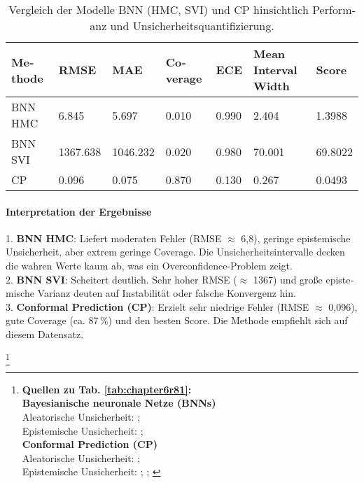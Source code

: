 \begin{otherlanguage}{ngerman}
\begin{table}[htbp]
\centering
\footnotesize
\begin{tabularx}{\textwidth}{|l|X|X|X|X|X|X|}
\hline
\textbf{Methode} & \textbf{RMSE} & \textbf{MAE} & \textbf{Coverage} & \textbf{ECE} & \textbf{Mean Interval Width} & \textbf{Score} \\
\hline
BNN HMC & 6.845 & 5.697 & 0.010 & 0.990 & 2.404 & 1.3988 \\
\hline
BNN SVI & 1367.638 & 1046.232 & 0.020 & 0.980 & 70.001 & 69.8022 \\
\hline
CP      & 0.096 & 0.075 & 0.870 & 0.130 & 0.267 & 0.0493 \\
\hline
\end{tabularx}
\caption{Vergleich der Modelle BNN (HMC, SVI) und CP hinsichtlich Performanz und Unsicherheitsquantifizierung.}
\label{tab:r8_results}
\end{table}


\paragraph{Interpretation der Ergebnisse}

1. \textbf{BNN HMC}: Liefert moderaten Fehler (RMSE $\approx$ 6{,}8), geringe epistemische Unsicherheit, aber extrem geringe Coverage. Die Unsicherheitsintervalle decken die wahren Werte kaum ab, was ein Overconfidence-Problem zeigt.\\
2. \textbf{BNN SVI}: Scheitert deutlich. Sehr hoher RMSE ($\approx$ 1367) und große epistemische Varianz deuten auf Instabilität oder falsche Konvergenz hin.\\
3. \textbf{Conformal Prediction (CP)}: Erzielt sehr niedrige Fehler (RMSE $\approx$ 0{,}096), gute Coverage (ca. 87\,\%) und den besten Score. Die Methode empfiehlt sich auf diesem Datensatz.



\footnote{%
\begin{minipage}[t]{\textwidth}
\scriptsize
\textbf{Quellen zu Tab. \ref{tab:chapter6r81}:}\\[0.5em]
\textbf{Bayesianische neuronale Netze (BNNs)}\\
Aleatorische Unsicherheit: \parencite[Kap.~3]{blundell2015weight}; \parencite[S.~40–42]{gal2016uncertainty} \\
Epistemische Unsicherheit: \parencite[S.~40–42]{gal2016uncertainty}; \parencite{mackay1992practical} \\[0.5em]

\textbf{Conformal Prediction (CP)}\\
Aleatorische Unsicherheit: \parencite[S.~4–5]{vovk2005algorithmic}; \parencite{angelopoulos2021gentle} \\
Epistemische Unsicherheit: \parencite{angelopoulos2021gentle}; \parencite[S.~63–65]{shafer2008tutorial}; \parencite{rasmussen2006gaussian}
\end{minipage}%
}



\end{otherlanguage}
